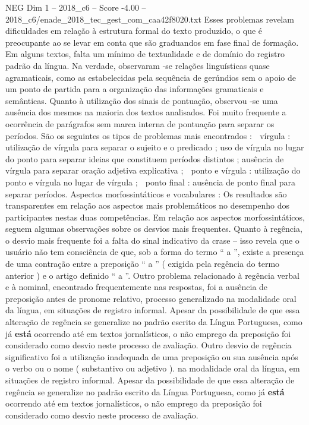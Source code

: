 \begin{textsample}{NEG Dim 1 – 2018\_c6 – Score -4.00 – 2018\_c6/enade\_2018\_tec\_gest\_com\_caa42f8020.txt}
Esses problemas revelam dificuldades em relação à estrutura formal do texto produzido, o que é preocupante ao se levar em conta que são graduandos em fase final de formação.
Em alguns textos, falta um mínimo de textualidade e de domínio do registro padrão da língua.
Na verdade, observaram -se relações linguísticas quase agramaticais, como as estabelecidas pela sequência de gerúndios sem o apoio de um ponto de partida para a organização das informações gramaticais e semânticas.
Quanto à utilização dos sinais de pontuação, observou -se uma ausência dos mesmos na maioria dos textos analisados.
Foi muito frequente a ocorrência de parágrafos sem marca interna de pontuação para separar os períodos.
São os seguintes os tipos de problemas mais encontrados :  vírgula : utilização de vírgula para separar o sujeito e o predicado ; uso de vírgula no lugar do ponto para separar ideias que constituem períodos distintos ; ausência de vírgula para separar oração adjetiva explicativa ;  ponto e vírgula : utilização do ponto e vírgula no lugar de vírgula ;  ponto final : ausência de ponto final para separar períodos.
Aspectos morfossintáticos e vocabulares : Os resultados são transparentes em relação aos aspectos mais problemáticos no desempenho dos participantes nestas duas competências.
Em relação aos aspectos morfossintáticos, seguem algumas observações sobre os desvios mais frequentes.
Quanto à regência, o desvio mais frequente foi a falta do sinal indicativo da crase – isso revela que o usuário não tem consciência de que, sob a forma do termo “ a ”, existe a presença de uma contração entre a preposição “ a ” ( exigida pela regência do termo anterior ) e o artigo definido “ a ”.
Outro problema relacionado à regência verbal e à nominal, encontrado frequentemente nas respostas, foi a ausência de preposição antes de pronome relativo, processo generalizado na modalidade oral da língua, em situações de registro informal.
Apesar da possibilidade de que essa alteração de regência se generalize no padrão escrito da Língua Portuguesa, como já \textbf{está} ocorrendo até em textos jornalísticos, o não emprego da preposição foi considerado como desvio neste processo de avaliação.
Outro desvio de regência significativo foi a utilização inadequada de uma preposição ou sua ausência após o verbo ou o nome ( substantivo ou adjetivo ). na modalidade oral da língua, em situações de registro informal.
Apesar da possibilidade de que essa alteração de regência se generalize no padrão escrito da Língua Portuguesa, como já \textbf{está} ocorrendo até em textos jornalísticos, o não emprego da preposição foi considerado como desvio neste processo de avaliação.

\end{textsample}
